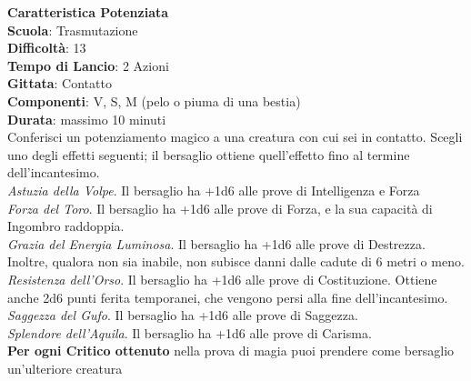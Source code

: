 \begin{multicols}{2}
\medskip\textbf{Caratteristica Potenziata}\\
\textbf{Scuola}: Trasmutazione\\
\textbf{Difficoltà}: 13\\
\textbf{Tempo di Lancio}: 2 Azioni\\
\textbf{Gittata}: Contatto\\
\textbf{Componenti}: V, S, M (pelo o piuma di una bestia)\\
\textbf{Durata}: massimo 10 minuti\\
Conferisci un potenziamento magico a una creatura con cui sei in contatto. Scegli uno degli effetti seguenti; il bersaglio ottiene quell'effetto fino al termine dell'incantesimo.\\
\textit{Astuzia della Volpe}. Il bersaglio ha +1d6 alle prove di Intelligenza e Forza\\
\textit{Forza del Toro}. Il bersaglio ha +1d6 alle prove di Forza, e la sua capacità di Ingombro raddoppia.\\
\textit{Grazia del Energia Luminosa}. Il bersaglio ha +1d6 alle prove di Destrezza. Inoltre, qualora non sia inabile, non subisce danni dalle cadute di 6 metri o meno.\\
\textit{Resistenza dell'Orso}. Il bersaglio ha +1d6 alle prove di Costituzione. Ottiene anche 2d6 punti ferita temporanei, che vengono persi alla fine dell'incantesimo.\\
\textit{Saggezza del Gufo}. Il bersaglio ha +1d6 alle prove di Saggezza. \\
\textit{Splendore dell'Aquila}. Il bersaglio ha +1d6 alle prove di Carisma.\\
\textbf{Per ogni Critico ottenuto} nella prova di magia puoi prendere come bersaglio un'ulteriore creatura


\end{multicols}
